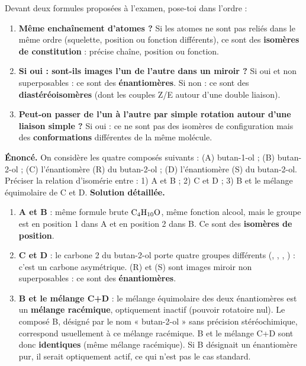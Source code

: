 \documentclass[11pt]{article}
\begin{document}
\begin{methode}
Devant deux formules proposées à l'examen, pose-toi dans l'ordre :
\begin{enumerate}
\item \textbf{Même enchaînement d'atomes ?} Si les atomes ne sont pas reliés dans le même ordre (squelette, position ou fonction différents), ce sont des \textbf{isomères de constitution} : précise chaîne, position ou fonction.
\item \textbf{Si oui : sont-ils images l'un de l'autre dans un miroir ?} Si oui et non superposables : ce sont des \textbf{énantiomères}. Si non : ce sont des \textbf{diastéréoisomères} (dont les couples Z/E autour d'une double liaison).
\item \textbf{Peut-on passer de l'un à l'autre par simple rotation autour d'une liaison simple ?} Si oui : ce ne sont pas des isomères de configuration mais des \textbf{conformations} différentes de la même molécule.
\end{enumerate}
\end{methode}

\begin{exoresolu}
\textbf{Énoncé.} On considère les quatre composés suivants : (A) butan-1-ol  ; (B) butan-2-ol  ; (C) l'énantiomère (R) du butan-2-ol ; (D) l'énantiomère (S) du butan-2-ol. Préciser la relation d'isomérie entre : 1) A et B ; 2) C et D ; 3) B et le mélange équimolaire de C et D.
\tcblower
\textbf{Solution détaillée.}
\begin{enumerate}
\item \textbf{A et B} : même formule brute $\ce{C4H10O}$, même fonction alcool, mais le groupe  est en position 1 dans A et en position 2 dans B. Ce sont des \textbf{isomères de position}.
\item \textbf{C et D} : le carbone 2 du butan-2-ol porte quatre groupes différents (, , , ) : c'est un carbone asymétrique. (R) et (S) sont images miroir non superposables : ce sont des \textbf{énantiomères}.
\item \textbf{B et le mélange C+D} : le mélange équimolaire des deux énantiomères est un \textbf{mélange racémique}, optiquement inactif (pouvoir rotatoire nul). Le composé B, désigné par le nom « butan-2-ol » sans précision stéréochimique, correspond usuellement à ce mélange racémique. B et le mélange C+D sont donc \textbf{identiques} (même mélange racémique). Si B désignait un énantiomère pur, il serait optiquement actif, ce qui n'est pas le cas standard.
\end{enumerate}
\end{exoresolu}
\end{document}
